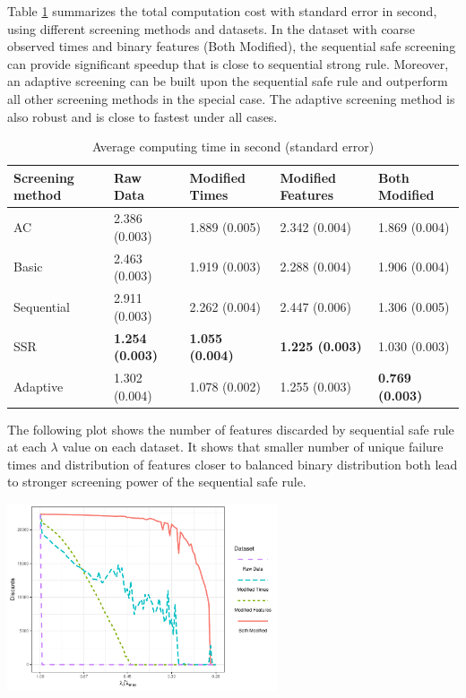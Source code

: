 Table \ref{Tab:real} summarizes the total computation cost with standard error in second, using different screening methods and datasets. In the dataset with coarse observed times and binary features (Both Modified), the sequential safe screening can provide significant speedup that is close to sequential strong rule. Moreover, an adaptive screening can be built upon the sequential safe rule and outperform all other screening methods in the special case. The adaptive screening method is also robust and is close to fastest under all cases.

\begin{table}[H]
\centering
\begin{tabular}{lllll}
\toprule
Screening method & Raw Data & Modified Times & Modified Features & Both Modified \\
\midrule
AC & 2.386 (0.003) & 1.889 (0.005) & 2.342 (0.004) & 1.869 (0.004) \\
Basic & 2.463 (0.003) & 1.919 (0.003) & 2.288 (0.004) & 1.906 (0.004) \\
Sequential & 2.911 (0.003) & 2.262 (0.004) & 2.447 (0.006) & 1.306 (0.005) \\
SSR & \textbf{1.254 (0.003)} & \textbf{1.055 (0.004)} & \textbf{1.225 (0.003)} & 1.030 (0.003) \\
Adaptive & 1.302 (0.004) & 1.078 (0.002) & 1.255 (0.003) & \textbf{0.769 (0.003)} \\
\bottomrule
\end{tabular}
\caption{Average computing time in second (standard error)}
\label{Tab:real}
\end{table}



The following plot shows the number of features discarded by sequential safe rule at each $\lambda$ value on each dataset. It shows that smaller number of unique failure times and distribution of features closer to balanced binary distribution both lead to stronger screening power of the sequential safe rule.

\begin{center}
    \includegraphics[width=0.6\textwidth]{shedden.pdf}
\end{center}

